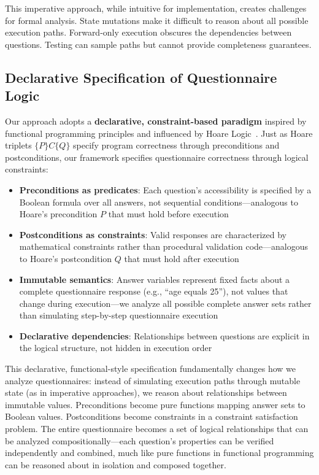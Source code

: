 This imperative approach, while intuitive for implementation, creates challenges for formal analysis. State mutations make it difficult to reason about all possible execution paths. Forward-only execution obscures the dependencies between questions. Testing can sample paths but cannot provide completeness guarantees.

\subsection{Declarative Specification of Questionnaire Logic}

Our approach adopts a \textbf{declarative, constraint-based paradigm} inspired by functional programming principles and influenced by Hoare Logic~\cite{hoare1969axiomatic}. Just as Hoare triplets $\{P\}C\{Q\}$ specify program correctness through preconditions and postconditions, our framework specifies questionnaire correctness through logical constraints:

\begin{itemize}
    \item \textbf{Preconditions as predicates}: Each question's accessibility is specified by a Boolean formula over all answers, not sequential conditions—analogous to Hoare's precondition $P$ that must hold before execution
    \item \textbf{Postconditions as constraints}: Valid responses are characterized by mathematical constraints rather than procedural validation code—analogous to Hoare's postcondition $Q$ that must hold after execution
    \item \textbf{Immutable semantics}: Answer variables represent fixed facts about a complete questionnaire response (e.g., ``age equals 25''), not values that change during execution—we analyze all possible complete answer sets rather than simulating step-by-step questionnaire execution
    \item \textbf{Declarative dependencies}: Relationships between questions are explicit in the logical structure, not hidden in execution order
\end{itemize}

This declarative, functional-style specification fundamentally changes how we analyze questionnaires: instead of simulating execution paths through mutable state (as in imperative approaches), we reason about relationships between immutable values. Preconditions become pure functions mapping answer sets to Boolean values. Postconditions become constraints in a constraint satisfaction problem. The entire questionnaire becomes a set of logical relationships that can be analyzed compositionally—each question's properties can be verified independently and combined, much like pure functions in functional programming can be reasoned about in isolation and composed together.

